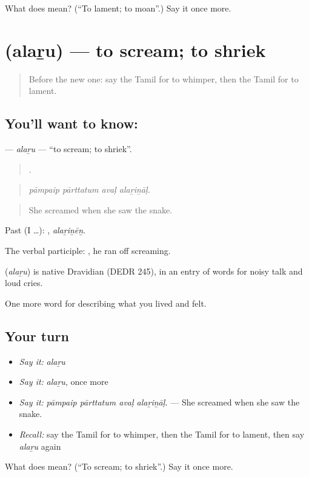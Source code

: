 \begin{tcolorbox}[breakable,colback=teal!4,colframe=teal!35!black,title={Before you move on}]
What does  mean? (\textquotedblleft{}To lament; to moan\textquotedblright{}.) Say it once more.
\end{tcolorbox}
\section[\texorpdfstring{\ta{அலறு} (alaṟu)}{அலறு (alaṟu)}]{ (alaṟu) — to scream; to shriek}

\label{lesson:TA-C458-alaru}



\begin{quote}
Before the new one: say the Tamil for to whimper, then the Tamil for to lament.
\end{quote}

\subsection*{You'll want to know: }
\textbf{} — \emph{alaṟu} — \textquotedblleft{}to scream; to shriek\textquotedblright{}.

\begin{quote}
   .
\end{quote}

\begin{quote}
\emph{pāmpaip pārttatum avaḷ alaṟiṉāḷ.}
\end{quote}

\begin{quote}
She screamed when she saw the snake.
\end{quote}

Past (I …): , \emph{alaṟiṉēṉ}.

The verbal participle:  , he ran off screaming.

\begin{cousinweb}
\textbf{} (\emph{alaṟu}) is native Dravidian (DEDR 245), in an entry of words for noisy talk and loud cries.
\end{cousinweb}

\begin{grammarlens}[title={What you've built}]
One more word for describing what you lived and felt.
\end{grammarlens}

\subsection*{Your turn}
\begin{itemize}
\raggedright
  \item \emph{Say it:} \emph{alaṟu}
  \item \emph{Say it:} \emph{alaṟu}, once more
  \item \emph{Say it:} \emph{pāmpaip pārttatum avaḷ alaṟiṉāḷ.} — She screamed when she saw the snake.
  \item \emph{Recall:} say the Tamil for to whimper, then the Tamil for to lament, then say \emph{alaṟu} again
\end{itemize}

\begin{tcolorbox}[breakable,colback=teal!4,colframe=teal!35!black,title={Before you move on}]
What does  mean? (\textquotedblleft{}To scream; to shriek\textquotedblright{}.) Say it once more.
\end{tcolorbox}
